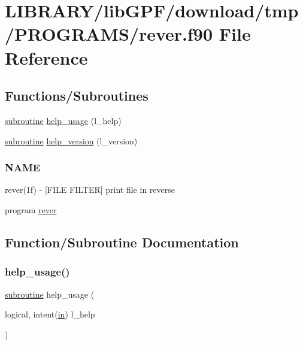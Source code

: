 \hypertarget{rever_8f90}{}\section{L\+I\+B\+R\+A\+R\+Y/lib\+G\+P\+F/download/tmp/\+P\+R\+O\+G\+R\+A\+M\+S/rever.f90 File Reference}
\label{rever_8f90}
\subsection*{Functions/\+Subroutines}
\begin{DoxyCompactItemize}
\item 
\hyperlink{M__stopwatch_83_8txt_acfbcff50169d691ff02d4a123ed70482}{subroutine} \hyperlink{rever_8f90_a3e09a3b52ee8fb04eeb93fe5761626a8}{help\+\_\+usage} (l\+\_\+help)
\item 
\hyperlink{M__stopwatch_83_8txt_acfbcff50169d691ff02d4a123ed70482}{subroutine} \hyperlink{rever_8f90_a39c21619b08a3c22f19e2306efd7f766}{help\+\_\+version} (l\+\_\+version)
\begin{DoxyCompactList}\small\item\em \subsubsection*{N\+A\+ME}

rever(1f) -\/ \mbox{[}F\+I\+LE F\+I\+L\+T\+ER\mbox{]} print file in reverse \end{DoxyCompactList}\item 
program \hyperlink{rever_8f90_aa04a8c02de71e8109e9239487c94ea6c}{rever}
\end{DoxyCompactItemize}


\subsection{Function/\+Subroutine Documentation}
\mbox{\label{rever_8f90_a3e09a3b52ee8fb04eeb93fe5761626a8}} 
\subsubsection{\texorpdfstring{help\+\_\+usage()}{help\_usage()}}
{\footnotesize\ttfamily \hyperlink{M__stopwatch_83_8txt_acfbcff50169d691ff02d4a123ed70482}{subroutine} help\+\_\+usage (\begin{DoxyParamCaption}\item[{logical, intent(\hyperlink{M__journal_83_8txt_afce72651d1eed785a2132bee863b2f38}{in})}]{l\+\_\+help }\end{DoxyParamCaption})}



